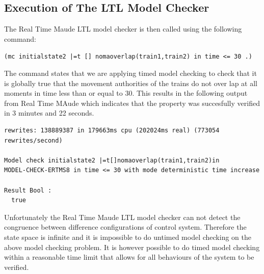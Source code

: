 \subsection{Execution of The LTL Model Checker}

The Real Time Maude LTL model checker is then called using the following command:

\begin{center}
\texttt{(mc initialstate2 |=t [] nomaoverlap(train1,train2) in time <= 30 .)}
\end{center}
The command states that we are applying timed model checking to check that it is globally true that the movement authorities of the trains do not over lap at all moments in time less than or equal to 30. This results in the following output from Real Time MAude which indicates that the property was succesfully verified in 3 minutes and 22 seconds.
\begin{verbatim}
rewrites: 138889387 in 179663ms cpu (202024ms real) (773054 rewrites/second)

Model check initialstate2 |=t[]nomaoverlap(train1,train2)in 
MODEL-CHECK-ERTMS8 in time <= 30 with mode deterministic time increase

Result Bool :
  true
\end{verbatim}

Unfortunately the Real Time Maude LTL model checker can not detect the congruence between difference configurations of control system. Therefore the state space is infinite and it is impossible to do untimed model checking on the above model checking problem. It is however possible to do timed model checking within a reasonable time limit that allows for all behaviours of the system to be verified.
